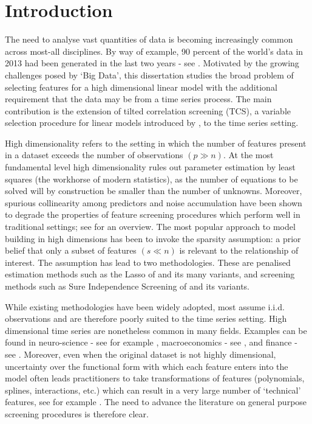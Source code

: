 \documentclass[11pt]{report}\usepackage[utf8]{inputenc}
\begin{document}
\setcounter{tocdepth}{1}
\tableofcontents
\listoffigures
\listoftables

\cleardoublepage
{}
\chapter{Introduction} \label{introduction}

The need to analyse vast quantities of data is becoming increasingly common across most-all disciplines. By way of example, 90 percent of the world's data in 2013 had been generated in the last two years - see \cite{Bigdata}. Motivated by the growing challenges posed by `Big Data', this dissertation studies the broad problem of selecting features for a high dimensional linear model with the additional requirement that the data may be from a time series process. The main contribution is the extension of tilted correlation screening (TCS), a variable selection procedure for linear models introduced by \cite{cho2012high}, to the time series setting. 

High dimensionality refers to the setting in which the number of features present in a dataset exceeds the number of observations $(p \gg n)$. At the most fundamental level high dimensionality rules out parameter estimation by least squares (the workhorse of modern statistics), as the number of equations to be solved will by construction be smaller than the number of unknowns. Moreover, spurious collinearity among predictors and noise accumulation have been shown to degrade the properties of feature screening procedures which perform well in traditional settings; see \cite{fan2010selective} for an overview. The most popular approach to model building in high dimensions has been to invoke the sparsity assumption: a prior belief that only a subset of features $(s \ll n)$ is relevant to the relationship of interest. The assumption has lead to two methodologies. These are penalised estimation methods such as the Lasso of \cite{tibshirani1996regression} and its many variants, and screening methods such as Sure Independence Screening of \cite{fan2008sure} and its variants.

While existing methodologies have been widely adopted, most assume i.i.d. observations and are therefore poorly suited to the time series setting. High dimensional time series are nonetheless common in many fields. Examples can be found in neuro-science - see for example \cite{valdes2005estimating}, macroeconomics - see \cite{stock2002macroeconomic}, and finance - see \cite{choi2019high}. Moreover, even when the original dataset is not highly dimensional, uncertainty over the functional form with which each feature enters into the model often leads practitioners to take transformations of features (polynomials, splines, interactions, etc.) which can result in a very large number of `technical' features, see for example \cite{belloni2014inference}. The need to advance the literature on general purpose screening procedures is therefore clear. 
\end{document}
